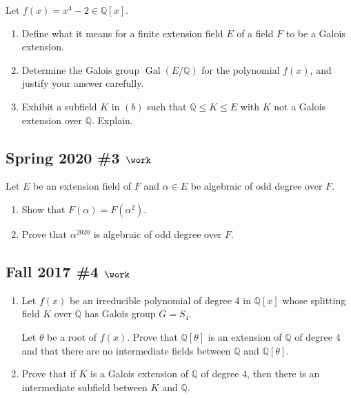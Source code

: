 Let \(f(x) = x^4-2 \in {\mathbb{Q}}[x]\).

\begin{enumerate}
\def\labelenumi{\alph{enumi}.}
\item
  Define what it means for a finite extension field \(E\) of a field
  \(F\) to be a Galois extension.
\item
  Determine the Galois group \({ \operatorname{Gal}} (E/{\mathbb{Q}})\)
  for the polynomial \(f(x)\), and justify your answer carefully.
\item
  Exhibit a subfield \(K\) in \((b)\) such that
  \({\mathbb{Q}}\leq K \leq E\) with \(K\) not a Galois extension over
  \({\mathbb{Q}}\). Explain.
\end{enumerate}

\hypertarget{spring-2020-3-work}{%
\subsection{\texorpdfstring{Spring 2020 \#3
\(\work\)}{Spring 2020 \#3 \textbackslash work}}\label{spring-2020-3-work}}

Let \(E\) be an extension field of \(F\) and \(\alpha\in E\) be
algebraic of odd degree over \(F\).

\begin{enumerate}
\def\labelenumi{\alph{enumi}.}
\item
  Show that \(F(\alpha) = F(\alpha^2)\).
\item
  Prove that \(\alpha^{2020}\) is algebraic of odd degree over \(F\).
\end{enumerate}

\hypertarget{fall-2017-4-work}{%
\subsection{\texorpdfstring{Fall 2017 \#4
\(\work\)}{Fall 2017 \#4 \textbackslash work}}\label{fall-2017-4-work}}

\begin{enumerate}
\def\labelenumi{\alph{enumi}.}
\item
  Let \(f (x)\) be an irreducible polynomial of degree 4 in
  \({\mathbb{Q}}[x]\) whose splitting field \(K\) over \({\mathbb{Q}}\)
  has Galois group \(G = S_4\).

  Let \(\theta\) be a root of \(f(x)\). Prove that
  \({\mathbb{Q}}[\theta]\) is an extension of \({\mathbb{Q}}\) of degree
  4 and that there are no intermediate fields between \({\mathbb{Q}}\)
  and \({\mathbb{Q}}[\theta]\).
\item
  Prove that if \(K\) is a Galois extension of \({\mathbb{Q}}\) of
  degree 4, then there is an intermediate subfield between \(K\) and
  \({\mathbb{Q}}\).
\end{enumerate}

